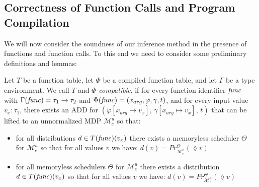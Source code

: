 \subsection{Correctness of Function Calls and Program Compilation}\label{ProgramAppendix}
We will now consider the soundness of our inference method in the presence of functions and function calls.
To this end we need to consider some preliminary definitions and lemmas:


\begin{definition}
	Let $T$ be a function table, let $\Phi$ be a compiled function table, and let $\Gamma$ be a type environment.
	We call $T$ and $\Phi$ \textit{compatible}, if for every function identifier $\mathit{func}$ with $\Gamma(\mathit{func}) = \tau_1 \rightarrow \tau_2$ and $\Phi(\mathit{func}) = (x_{arg}, \dot{\varphi}, \gamma, t)$, and for every input value $v_x \colon \tau_1$, there exists an ADD for $(\dot{\varphi}[x_{arg}\mapsto v_x],\, \gamma[x_{arg}\mapsto v_x],\, t)$ that can be lifted to an unnormalized MDP $\mathcal{M}^u_e$ so that:
	\begin{itemize}
		\item for all distributions $d \in T(\mathit{func})(v_x)$ there exists a memoryless scheduler $\Theta$ for $\mathcal{M}^u_e$ so that for all values $v$ we have: $d(v) = Pr^\Theta_{\mathcal{M}^u_e}(\lozenge v)$
		\item for all memoryless schedulers $\Theta$ for $\mathcal{M}^u_e$ there exists a distribution $d \in T(\mathit{func})(v_x)$ so that for all values $v$ we have: $d(v) = Pr^\Theta_{\mathcal{M}^u_e}(\lozenge v)$
	\end{itemize} 
\end{definition}


